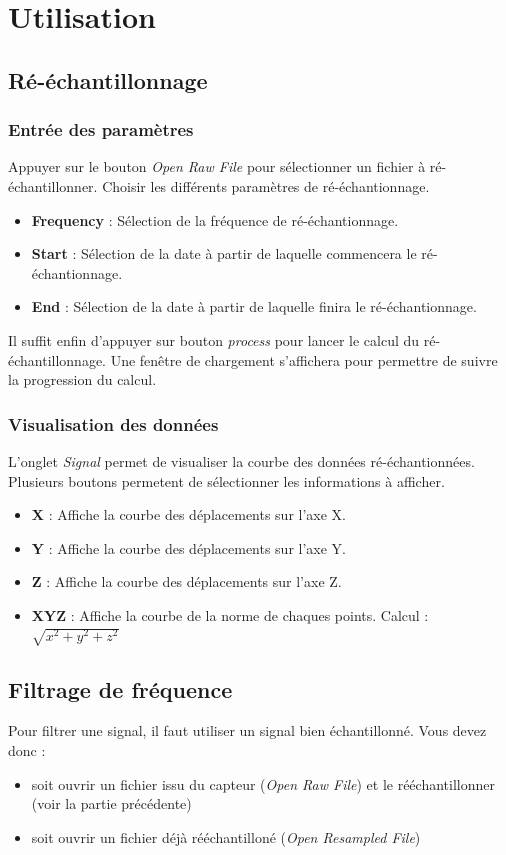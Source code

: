 \documentclass[a4paper,12pt]{article}
\begin{document}
\section{Utilisation}
\subsection{Ré-échantillonnage}
\subsubsection{Entrée des paramètres}
Appuyer sur le bouton \emph{Open Raw File} pour sélectionner un fichier à ré-échantillonner.
Choisir les différents paramètres de ré-échantionnage.
\begin{itemize}
 \item \textbf{Frequency} : Sélection de la fréquence de ré-échantionnage.
 \item \textbf{Start} : Sélection de la date à partir de laquelle commencera le ré-échantionnage.
 \item \textbf{End} : Sélection de la date à partir de laquelle finira le ré-échantionnage.
\end{itemize}

Il suffit enfin d'appuyer sur bouton \emph{process} pour lancer le calcul du ré-échantillonnage. Une fenêtre de chargement s'affichera 
pour permettre de suivre la progression du calcul.


\subsubsection{Visualisation des données}
L'onglet \emph{Signal} permet de visualiser la courbe des données ré-échantionnées.
Plusieurs boutons permetent de sélectionner les informations à afficher.
\begin{itemize}
  \item \textbf{X} : Affiche la courbe des déplacements sur l'axe X.
  \item \textbf{Y} : Affiche la courbe des déplacements sur l'axe Y.
  \item \textbf{Z} : Affiche la courbe des déplacements sur l'axe Z.
  \item \textbf{XYZ} : Affiche la courbe de la norme de chaques points. Calcul : $\sqrt{x^2 + y^2 + z^2}$
\end{itemize}

\subsection{Filtrage de fréquence}
Pour filtrer une signal, il faut utiliser un signal bien échantillonné.
Vous devez donc :
\begin{itemize}
 \item soit ouvrir un fichier issu du capteur (\emph{Open Raw File}) et le rééchantillonner (voir la partie précédente)
 \item soit ouvrir un fichier déjà rééchantilloné (\emph{Open Resampled File})
\end{itemize}
\end{document}
